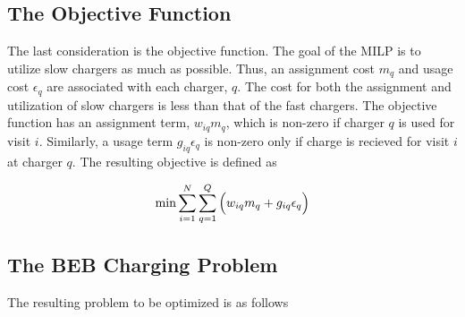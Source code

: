 \documentclass[letterpaper, 10pt, conference]{IEEEtran}
\begin{document}
\subsection{The Objective Function}
The last consideration is the objective function. The goal of the MILP is to utilize slow chargers as much as possible. Thus, an assignment cost $m_q$ and usage cost $\epsilon_q$ are associated with each charger, $q$. The cost for both the assignment and utilization of slow chargers is less than that of the fast chargers. The objective function has an assignment term, $w_{iq}m_q$, which is non-zero if charger $q$ is used for visit $i$. Similarly, a usage term $g_{iq} \epsilon_q$ is non-zero only if charge is recieved for visit $i$ at charger $q$. The resulting objective is defined as

\begin{equation}
\label{eq:objective}
	\min \sum_{i=1}^N \sum_{q=1}^Q \Big( w_{iq} m_q + g_{iq} \epsilon_q \Big) \\
\end{equation}

\subsection{The BEB Charging Problem}
The resulting problem to be optimized is as follows
\end{document}
